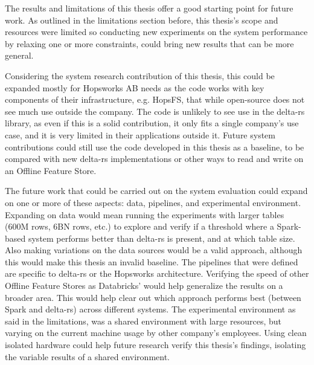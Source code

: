 The results and limitations of this thesis offer a good starting point for future work. As outlined in the limitations section before, this thesis's scope and resources were limited so conducting new experiments on the system performance by relaxing one or more constraints, could bring new results that can be more general.

Considering the system research contribution of this thesis, this could be expanded mostly for Hopsworks \gls{AB} needs as the code works with key components of their infrastructure, e.g. \gls{HopsFS}, that while open-source does not see much use outside the company. The code is unlikely to see use in the delta-rs library, as even if this is a solid contribution, it only fits a single company's use case, and it is very limited in their applications outside it. Future system contributions could still use the code developed in this thesis as a baseline, to be compared with new delta-rs implementations or other ways to read and write on an Offline Feature Store.

The future work that could be carried out on the system evaluation could expand on one or more of these aspects: data, pipelines, and experimental environment. Expanding on data would mean running the experiments with larger tables (600M rows, 6BN rows, etc.) to explore and verify if a threshold where a Spark-based system performs better than delta-rs is present, and at which table size. Also making variations on the data sources would be a valid approach, although this would make this thesis an invalid baseline. The pipelines that were defined are specific to delta-rs or the Hopsworks architecture. Verifying the speed of other Offline Feature Stores as Databricks' would help generalize the results on a broader area. This would help clear out which approach performs best (between Spark and delta-rs) across different systems.
The experimental environment as said in the limitations, was a shared environment with large resources, but varying on the current machine usage by other company's employees. Using clean isolated hardware could help future research verify this thesis's findings, isolating the variable results of a shared environment.